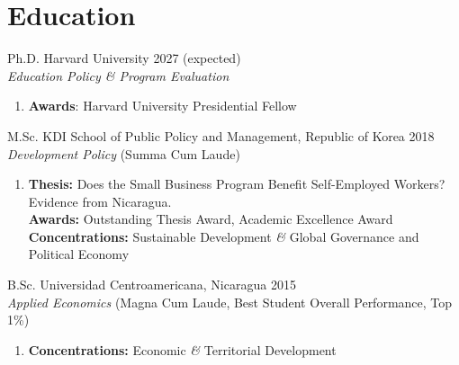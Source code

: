 \documentclass[a4paper, 10pt]{article}
\renewenvironment{itemize}{
  \begin{list}{}
    { \setlength{\itemsep}{5pt}
      \setlength{\parsep}{0pt}
      \setlength{\topsep}{0pt}
      \setlength{\leftmargin}{0em} } }{
  \end{list}}
\begin{document}
\section*{Education}

\begin{itemize}
\item Ph.D. Harvard University \hfill 2027 (expected) \\
{\small \textit{Education Policy \& Program Evaluation}}
  \begin{enumerate}[leftmargin=10pt, label={}, nosep]
    \item {\small \textbf{Awards}: Harvard University Presidential Fellow }
  \end{enumerate}

\item M.Sc. KDI School of Public Policy and Management, Republic of Korea \hfill 2018 \\
{\small \textit{Development Policy} (Summa Cum Laude)}
  
  \begin{enumerate}[leftmargin=10pt, label={}, nosep]
    \item {\small \textbf{Thesis:} Does the Small Business Program Benefit Self-Employed Workers? Evidence from Nicaragua. \\ 
    \textbf{Awards:} Outstanding Thesis Award, Academic Excellence Award \\ 
    \textbf{Concentrations:} Sustainable Development \textit{\&} Global Governance and Political Economy }
  \end{enumerate}
\item B.Sc. Universidad Centroamericana, Nicaragua \hfill 2015 \\
{\small \textit{Applied Economics} (Magna Cum Laude, Best Student Overall Performance, Top 1\%)}
  
  \begin{enumerate}[leftmargin=10pt, label={}, nosep]
    \item {\small \textbf{Concentrations:} Economic \textit{\&} Territorial Development}
  \end{enumerate}
\end{itemize}


\end{document}

